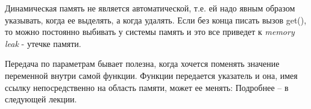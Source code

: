 \begin{lecture}[\lectureSubject]
\begin{lecSection}
	\end{lecSection}
	\begin{lecSection}
		Динамическая память не является автоматической, т.е. ей надо явным образом указывать, когда ее выделять, а когда удалять. Если без конца писать вызов get(), то можно постоянно выбивать у системы память и это все приведет к \textit{memory leak} - утечке памяти.
	\end{lecSection}
	\begin{lecSection}
		Передача по параметрам бывает полезна, когда хочется поменять значение переменной внутри самой функции. Функции передается указатель и она, имея ссылку непосредственно на область памяти, может ее менять:
		Подробнее -- в следующей лекции.
	\end{lecSection}
\end{lecture}
